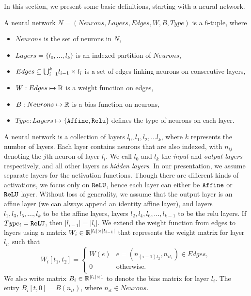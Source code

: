 In this section, we present some basic definitions, starting with a neural network.

\begin{df}
  \label{def:net}
    A neural network $N = (Neurons, Layers, Edges, W, B, Type)$ is a 6-tuple, where
    \begin{itemize}
        \item $Neurons$ is the set of neurons in $N$,
        \item $Layers = \{l_0,...,l_k\}$ is an indexed partition of $Neurons$,
        \item $ Edges \subseteq {\bigcup}_{i=1}^{k} l_{i-1} \times l_{i}$ is a set of edges linking neurons on consecutive layers,
        \item $W : Edges \mapsto \mathbb{R}$ is a weight function on edges,
        \item $B : Neurons \mapsto \mathbb{R}$ is a bias function on neurons,
        \item $Type : Layers \mapsto \{\mathtt{Affine}, \mathtt{Relu}\}$ defines the type of neurons on each layer.
    \end{itemize}
\end{df}

A neural network is a collection of layers $l_0, l_1, l_2, ... l_k$, where $k$ represents the number of layers. Each layer contains neurons that are also indexed, with $n_{ij}$ denoting the $j$th neuron of layer $l_i$. We call $l_0$ and $l_k$ the {\em input} and {\em output layers} respectively, and all other layers as {\em hidden layers}. In our presentation, we assume separate layers for the activation functions. Though there are different kinds of activations, we focus only on $\texttt{ReLU}${}, hence each layer can either be  $\texttt{Affine}${} or $\texttt{ReLU}${} layer. Without loss of generality, we assume that the output layer is an affine layer (we can always append an identity affine layer), and layers $l_1, l_3, l_5, ..., l_k$ to be the affine layers, layers $l_2, l_4, l_6, ..., l_{k-1}$ to be the relu layers. If $Type_i = \texttt{ReLU}$, then $|l_{i-1}| = |l_{i}|$. We extend the weight function from edges to layers using a matrix $W_i \in \mathbb{R}^{|l_i|\times|l_{i-1}|}$ that represents the weight matrix for layer $l_i$, such that
$$
W_i[t_1, t_2] = 
\begin{cases}
  W(e) & e=(n_{(i-1)t_2}, n_{it_1}) \in Edges,\\
  0 & \text{otherwise.}\\
\end{cases}
$$
We also write matrix $B_i \in \mathbb{R}^{|l_i|\times 1}$ to denote the bias matrix for layer $l_i$. The entry $B_i[t,0] = B(n_{it})$, where $n_{it} \in Neurons$. 

